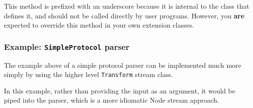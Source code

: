This method is prefixed with an underscore because it is internal to the
class that defines it, and should not be called directly by user
programs. However, you \textbf{are} expected to override this method in
your own extension classes.

\subsubsection{Example: \texttt{SimpleProtocol} parser}

The example above of a simple protocol parser can be implemented much
more simply by using the higher level \texttt{Transform} stream class.

In this example, rather than providing the input as an argument, it
would be piped into the parser, which is a more idiomatic Node stream
approach.

